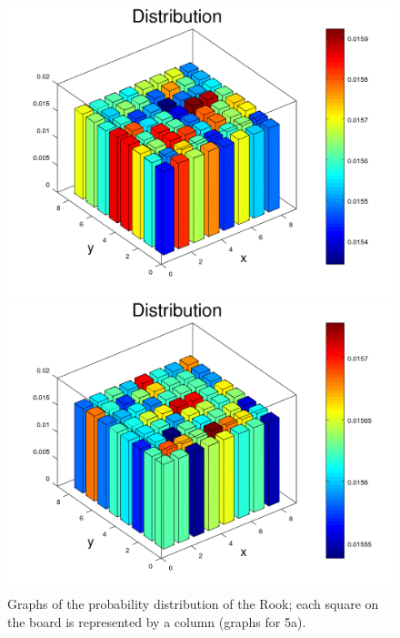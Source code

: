 \documentclass{amsart}
\numberwithin{equation}{section}
\begin{document}
\begin{figure}[!h]
\begin{minipage}{0.50\textwidth}
     \includegraphics[width=1.0\linewidth]{figures/regular/figure_Rook_path_n1000000.png}
     \captionsetup{labelformat=empty}
     \caption*{$n=1,000,000$}
   \end{minipage}\hfil
   \begin{minipage}{0.50\textwidth}
     \centering
     \includegraphics[width=1.0\linewidth]{figures/regular/figure_Rook_path_n10000000.png}
     \captionsetup{labelformat=empty}
     \caption*{$n=10,000,000$}
    \end{minipage}\hfil
    \caption{Graphs of the probability distribution of the Rook; each square on the board is represented by a column (graphs for 5a).}
    \label{plots:graphs_5a}
\end{figure}
\end{document}
